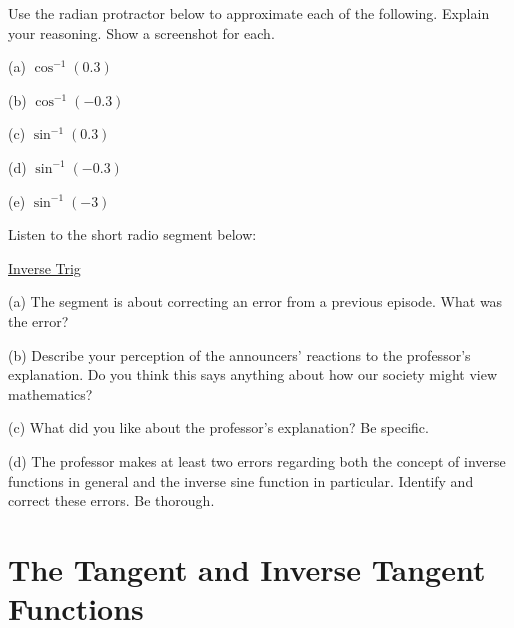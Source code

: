 \documentclass{ximera}
\begin{document}
\begin{example} \label{Ex1:Inverse}
Use the radian protractor below to approximate each of the following. Explain your reasoning. Show a screenshot for each.

(a) $\cos^{-1}(0.3)$

(b) $\cos^{-1}(-0.3)$

(c) $\sin^{-1}(0.3)$

(d) $\sin^{-1}(-0.3)$

(e) $\sin^{-1}(-3)$


\begin{exploration}\label{Exp3:Comp}

 
\begin{onlineOnly}
    \begin{center}
\end{center}
\end{onlineOnly}
\end{exploration}

\end{example}

\begin{question} \label{Q8:Inverses}

Listen to the short radio segment below:

\href{https://www.npr.org/2023/04/02/1167645463/sunday-puzzle-correction-a-
lesson-in-trigonometry}{Inverse Trig}


(a) The segment is about correcting an error from a previous episode. What was the error?


(b) Describe your perception of the announcers’ reactions to the professor’s explanation. Do you think this says anything about how our society might view mathematics?

(c) What did you like about the professor’s explanation? Be specific.

(d) The professor makes at least two errors regarding both the concept of inverse functions in general and the inverse sine function in particular. Identify and correct these errors. Be thorough.

\end{question}

\section{The Tangent and Inverse Tangent Functions}
\end{document}

